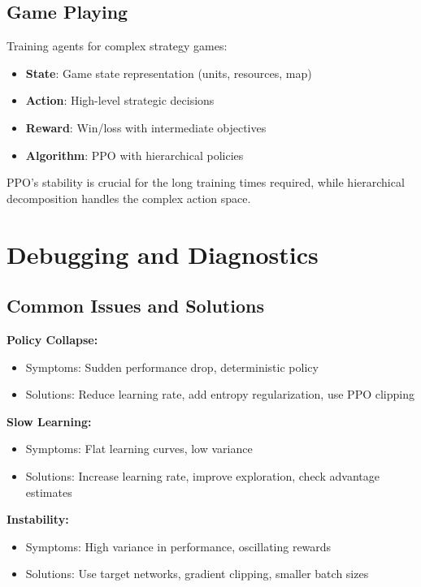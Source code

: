 \subsection{Game Playing}

\begin{examplebox}
Training agents for complex strategy games:
\begin{itemize}
    \item \textbf{State}: Game state representation (units, resources, map)
    \item \textbf{Action}: High-level strategic decisions
    \item \textbf{Reward}: Win/loss with intermediate objectives
    \item \textbf{Algorithm}: PPO with hierarchical policies
\end{itemize}

PPO's stability is crucial for the long training times required, while hierarchical decomposition handles the complex action space.
\end{examplebox}

\section{Debugging and Diagnostics}

\subsection{Common Issues and Solutions}

\textbf{Policy Collapse:}
\begin{itemize}
    \item Symptoms: Sudden performance drop, deterministic policy
    \item Solutions: Reduce learning rate, add entropy regularization, use PPO clipping
\end{itemize}

\textbf{Slow Learning:}
\begin{itemize}
    \item Symptoms: Flat learning curves, low variance
    \item Solutions: Increase learning rate, improve exploration, check advantage estimates
\end{itemize}

\textbf{Instability:}
\begin{itemize}
    \item Symptoms: High variance in performance, oscillating rewards
    \item Solutions: Use target networks, gradient clipping, smaller batch sizes
\end{itemize}

